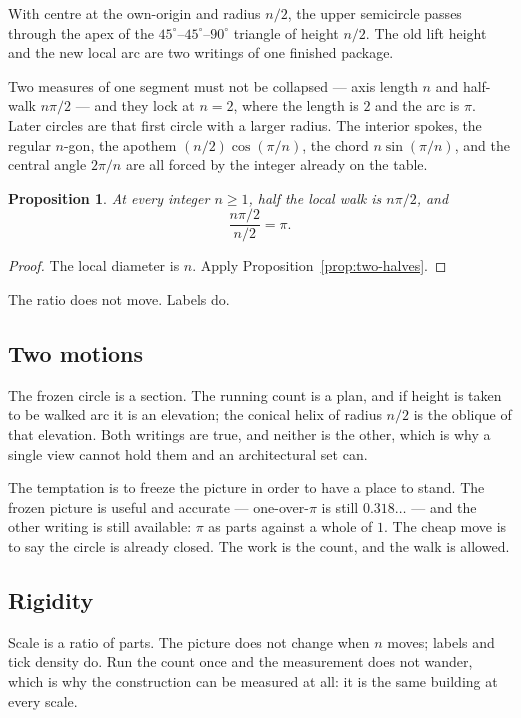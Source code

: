 \documentclass[10pt,a4paper]{article}
\theoremstyle{plain}
\newtheorem{proposition}{Proposition}
\theoremstyle{definition}
\theoremstyle{remark}
\begin{document}
With centre at the own-origin and radius \(n/2\), the upper semicircle passes through the apex of the \(45^\circ\)--\(45^\circ\)--\(90^\circ\) triangle of height \(n/2\).
The old lift height and the new local arc are two writings of one finished package.

Two measures of one segment must not be collapsed --- axis length \(n\) and half-walk \(n\pi/2\) --- and they lock at \(n=2\), where the length is \(2\) and the arc is \(\pi\).
Later circles are that first circle with a larger radius.
The interior spokes, the regular \(n\)-gon, the apothem \((n/2)\cos(\pi/n)\), the chord \(n\sin(\pi/n)\), and the central angle \(2\pi/n\) are all forced by the integer already on the table.

\begin{proposition}
\label{prop:half-walk}
At every integer \(n\ge 1\), half the local walk is \(n\pi/2\), and
\[
\frac{n\pi/2}{n/2}=\pi.
\]
\end{proposition}

\begin{proof}
The local diameter is \(n\).
Apply Proposition~\ref{prop:two-halves}.
\end{proof}

The ratio does not move.
Labels do.

\subsection{Two motions}

The frozen circle is a section.
The running count is a plan, and if height is taken to be walked arc it is an elevation; the conical helix of radius \(n/2\) is the oblique of that elevation.
Both writings are true, and neither is the other, which is why a single view cannot hold them and an architectural set can.

The temptation is to freeze the picture in order to have a place to stand.
The frozen picture is useful and accurate --- one-over-\(\pi\) is still \(0.318\ldots\) --- and the other writing is still available: \(\pi\) as parts against a whole of \(1\).
The cheap move is to say the circle is already closed.
The work is the count, and the walk is allowed.

\subsection{Rigidity}

Scale is a ratio of parts.
The picture does not change when \(n\) moves; labels and tick density do.
Run the count once and the measurement does not wander, which is why the construction can be measured at all: it is the same building at every scale.
\end{document}
